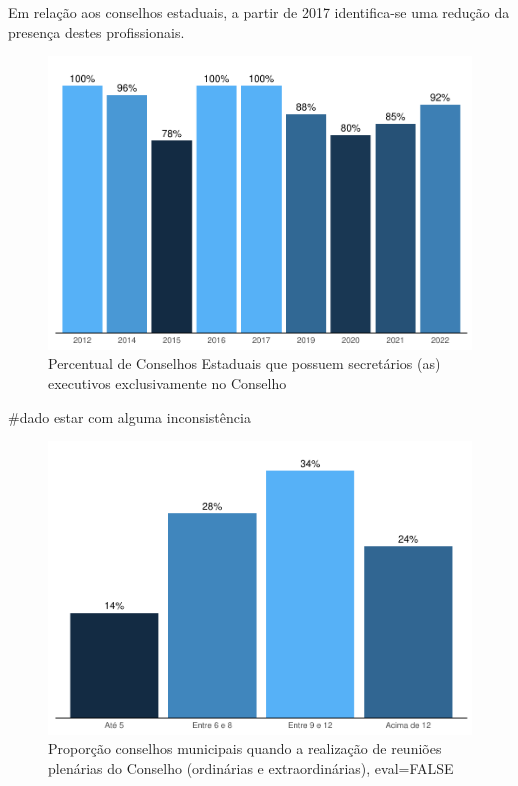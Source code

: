 \documentclass[
  brazilian]{report}
\begin{document}
Em relação aos conselhos estaduais, a partir de 2017 identifica-se uma
redução da presença destes profissionais.

\begin{figure}
\includegraphics{Censo-SUAS-2022_files/figure-latex/ceas_se-1} \caption[Percentual de Conselhos Estaduais que possuem secretários (as) executivos exclusivamente no Conselho]{Percentual de Conselhos Estaduais que possuem secretários (as) executivos exclusivamente no Conselho}\label{fig:ceas_se}
\end{figure}

\#dado estar com alguma inconsistência

\begin{figure}
\includegraphics{Censo-SUAS-2022_files/figure-latex/qtdcmas_reuniao-1} \caption[Proporção conselhos municipais quando a realização de reuniões plenárias do Conselho (ordinárias e extraordinárias), eval=FALSE]{Proporção conselhos municipais quando a realização de reuniões plenárias do Conselho (ordinárias e extraordinárias), eval=FALSE}\label{fig:qtdcmas_reuniao}
\end{figure}
\end{document}
